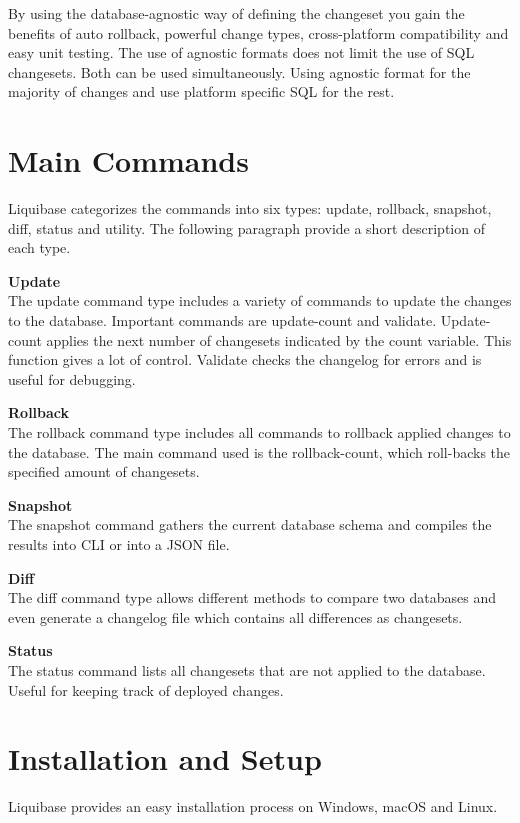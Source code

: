 By using the database-agnostic way of defining the changeset you gain the benefits of auto rollback, powerful change types, cross-platform compatibility and easy unit testing. The use of agnostic formats does not limit the use of \gls{SQL} changesets. Both can be used simultaneously. Using agnostic format for the majority of changes and use platform specific \gls{SQL} for the rest.


\section{Main Commands}
Liquibase categorizes the commands into six types: update, rollback, snapshot, diff, status and utility. The following paragraph provide a short description of each type.

\textbf{Update}\\
%
The update command type includes a variety of commands to update the changes to the database. Important commands are update-count and validate. Update-count applies the next number of changesets indicated by the count variable. This function gives a lot of control. Validate checks the changelog for errors and is useful for debugging.

\textbf{Rollback}\\
%
The rollback command type includes all commands to rollback applied changes to the database. The main command used is the rollback-count, which roll-backs the specified amount of changesets.

\textbf{Snapshot}\\
%
The snapshot command gathers the current database schema and compiles the results into \gls{CLI} or into a JSON file.

\textbf{Diff}\\
%
The diff command type allows different methods to compare two databases and even generate a changelog file which contains all differences as changesets.

\textbf{Status}\\
%
The status command lists all changesets that are not applied to the database. Useful for keeping track of deployed changes.


\section{Installation and Setup}
%
Liquibase provides an easy installation process on Windows, macOS and Linux.

